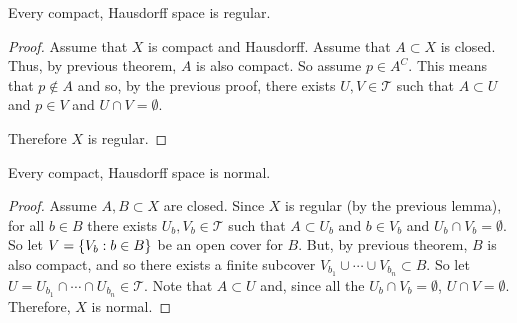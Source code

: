 \documentclass[letterpaper,12pt,fleqn]{article}
\newcommand{\T}{\mathscr{T}}
\begin{document}
\begin{lemma}
  Every compact, Hausdorff space is regular.
\end{lemma}

\begin{proof}
  Assume that \(X\) is compact and Hausdorff.  Assume that \(A\subset X\) is closed.  Thus, by previous theorem,
  \(A\) is also compact.  So assume \(p\in A^C\).  This means that \(p\notin A\) and so, by the previous proof,
  there exists \(U,V\in\T\) such that \(A\subset U\) and \(p\in V\) and \(U\cap V=\emptyset\).

  Therefore \(X\) is regular.
\end{proof}

\begin{theorem}[6.12]
  Every compact, Hausdorff space is normal.
\end{theorem}

\begin{proof}
  Assume \(A,B\subset X\) are closed.  Since \(X\) is regular (by the previous lemma), for all \(b\in B\) there
  exists \(U_b,V_b\in\T\) such that \(A\subset U_b\) and \(b\in V_b\) and \(U_b\cap V_b=\emptyset\).  So let
  \(V=\{V_b:b\in B\}\) be an open cover for \(B\).  But, by previous theorem, \(B\) is also compact, and so
  there exists a finite subcover \(V_{b_1}\cup\cdots\cup V_{b_n}\subset B\).  So let
  \(U=U_{b_1}\cap\cdots\cap U_{b_n}\in\T\).  Note that \(A\subset U\) and, since all the \(U_b\cap V_b=\emptyset\),
  \(U\cap V=\emptyset\).  Therefore, \(X\) is normal.
\end{proof}
\end{document}
